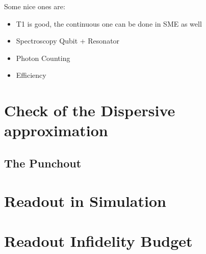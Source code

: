 Some nice ones are:
\begin{itemize}
    \item T1 is good, the continuous one can be done in SME as well
    \item Spectroscopy Qubit + Resonator
    \item Photon Counting
    \item Efficiency 
\end{itemize}


\section{Check of the Dispersive approximation}

\subsection{The Punchout}

\section{Readout in Simulation}




\section{Readout Infidelity Budget}